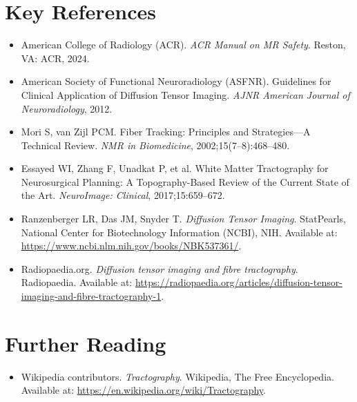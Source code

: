 \section{Key References}

\begin{itemize}
    \item American College of Radiology (ACR). \textit{ACR Manual on MR Safety}. Reston, VA: ACR, 2024.
    \item American Society of Functional Neuroradiology (ASFNR). Guidelines for Clinical Application of Diffusion Tensor Imaging. \textit{AJNR American Journal of Neuroradiology}, 2012.
    \item Mori S, van Zijl PCM. Fiber Tracking: Principles and Strategies---A Technical Review. \textit{NMR in Biomedicine}, 2002;15(7--8):468--480.
    \item Essayed WI, Zhang F, Unadkat P, et al. White Matter Tractography for Neurosurgical Planning: A Topography-Based Review of the Current State of the Art. \textit{NeuroImage: Clinical}, 2017;15:659--672.
    \item Ranzenberger LR, Das JM, Snyder T. \textit{Diffusion Tensor Imaging}. StatPearls, National Center for Biotechnology Information (NCBI), NIH. Available at: \url{https://www.ncbi.nlm.nih.gov/books/NBK537361/}.
    \item Radiopaedia.org. \textit{Diffusion tensor imaging and fibre tractography}. Radiopaedia. Available at: \url{https://radiopaedia.org/articles/diffusion-tensor-imaging-and-fibre-tractography-1}.
\end{itemize}

\section{Further Reading}
\begin{itemize}
  \item Wikipedia contributors. \textit{Tractography}. Wikipedia, The Free Encyclopedia. Available at: \url{https://en.wikipedia.org/wiki/Tractography}.
\end{itemize}
